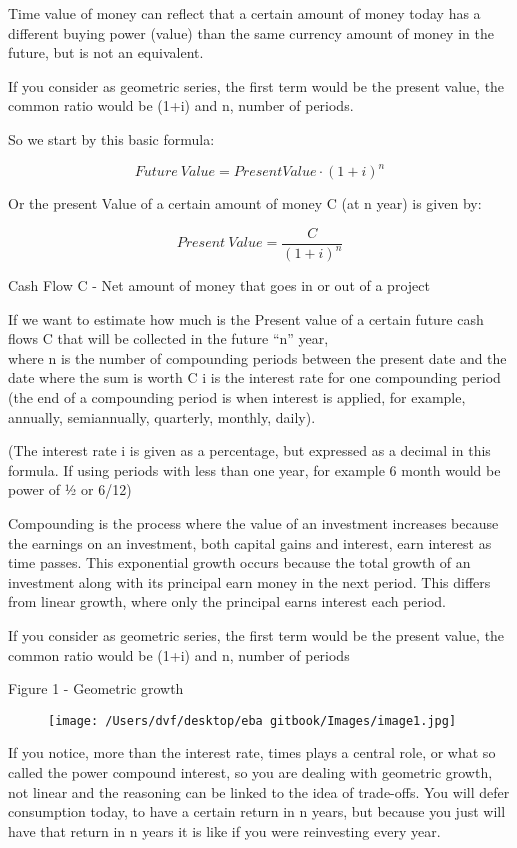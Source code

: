 \documentclass[]{book}
\theoremstyle{definition}
\theoremstyle{definition}
\theoremstyle{definition}
\theoremstyle{remark}
\begin{document}
Time value of money can reflect that a certain amount of money today has
a different buying power (value) than the same currency amount of money
in the future, but is not an equivalent.

If you consider as geometric series, the first term would be the present
value, the common ratio would be (1+i) and n, number of periods.

So we start by this basic formula:

\[Future\ Value = Present Value \cdot (1+i)^n\]

Or the present Value of a certain amount of money C (at n year) is given
by:

\[Present\ Value = \frac{C}{(1+i)^n}\]

Cash Flow C - Net amount of money that goes in or out of a project

If we want to estimate how much is the Present value of a certain future
cash flows C that will be collected in the future ``n'' year,\\
where n is the number of compounding periods between the present date
and the date where the sum is worth C i is the interest rate for one
compounding period (the end of a compounding period is when interest is
applied, for example, annually, semiannually, quarterly, monthly,
daily).

(The interest rate i is given as a percentage, but expressed as a
decimal in this formula. If using periods with less than one year, for
example 6 month would be power of ½ or 6/12)

Compounding is the process where the value of an investment increases
because the earnings on an investment, both capital gains and interest,
earn interest as time passes. This exponential growth occurs because the
total growth of an investment along with its principal earn money in the
next period. This differs from linear growth, where only the principal
earns interest each period.

If you consider as geometric series, the first term would be the present
value, the common ratio would be (1+i) and n, number of periods

Figure 1 - Geometric growth

\begin{figure}[htbp]
\centering
\texttt{[image: /Users/dvf/desktop/eba gitbook/Images/image1.jpg]}
\caption{}
\end{figure}

If you notice, more than the interest rate, times plays a central role,
or what so called the power compound interest, so you are dealing with
geometric growth, not linear and the reasoning can be linked to the idea
of trade-offs. You will defer consumption today, to have a certain
return in n years, but because you just will have that return in n years
it is like if you were reinvesting every year.
\end{document}

